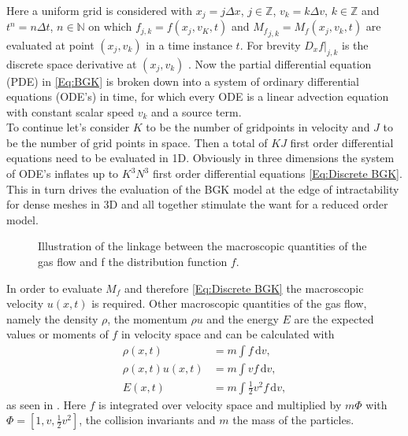 Here a uniform grid is considered with \(x_j = j\Delta x\), \(j \in \mathbb{Z}\), \(v_k = k\Delta v\), \(k \in \mathbb{Z}\) and \(t^n = n \Delta t\), \(n \in \mathbb{N}\) on which \(f_{j,k} = f(x_j,v_K,t)\) and \({M_f}_{j,k} = M_f(x_j,v_k,t)\) are evaluated at point \((x_j,v_k)\) in a time instance \(t\). For brevity \(D_x f|_{j,k}\) is the discrete space derivative at \((x_j,v_k)\) \cite{puppo2019kinetic}. Now the partial differential equation (PDE) in \cref{Eq:BGK} is broken down into a system of ordinary differential equations (ODE's) in time, for which every ODE is a linear advection equation with constant scalar speed \(v_k\) and a source term.\\ 
To continue let's consider \(K\) to be the number of gridpoints in velocity and \(J\) to be the number of grid points in space. Then a total of \(KJ\) first order differential equations need to be evaluated in 1D. Obviously in three dimensions the system of ODE's inflates up to \(K^3N^3\) first order differential equations \cref{Eq:Discrete BGK}. This in turn drives the evaluation of the BGK model at the edge of intractability for dense meshes in 3D and all together stimulate the want for a reduced order model.\\
\begin{wrapfigure}{r}{0.5\textwidth}
	\vspace{-10pt}
	\begin{center}
		\scalebox{.9}{}
	\end{center}
	\caption{Illustration of the linkage between the macroscopic quantities of the gas flow and f the distribution function \(f\).}
	\vspace{-40pt}
	\label{Fig:Demo Macro}
\end{wrapfigure}
In order to evaluate \(M_f\) and therefore \cref{Eq:Discrete BGK} the macroscopic velocity \(u(x,t)\) is required. Other macroscopic quantities of the gas flow, namely  the density \(\rho\), the momentum \(\rho u\) and the energy \(E\) are the expected values or moments of \(f\) in velocity space and can be calculated with 
\begin{align}
	\rho(x,t) &= m \int\! f \,\mathrm{d}v \mathrm{,} \label{Eq:Mom1}
	\\
	\rho(x,t) u(x,t) &= m \int\! v f \,\mathrm{d}v \mathrm{,} \label{Eq:Mom2}
	\\
	E(x,t) &= m \int\! \frac{1}{2}v^2 f  \,\mathrm{d}v \mathrm{,} \label{Eq:Mom:3}
\end{align}
as seen in  \cite{puppo2019kinetic}. Here \(f\) is integrated over velocity space and multiplied by \(m\Phi\) with \(\Phi = [1,v,\frac{1}{2} v^2]\), the collision invariants and \(m\) the mass of the particles.\\ 
